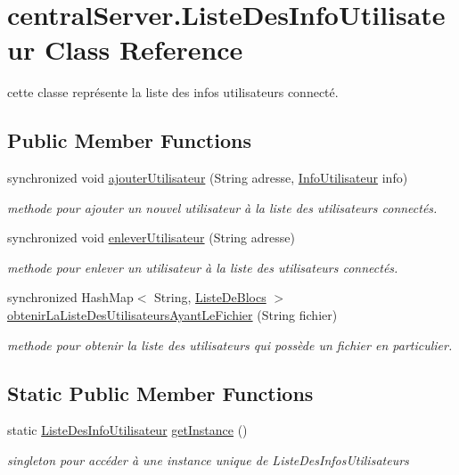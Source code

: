 \hypertarget{classcentralServer_1_1ListeDesInfoUtilisateur}{}\section{central\+Server.\+Liste\+Des\+Info\+Utilisateur Class Reference}
\label{classcentralServer_1_1ListeDesInfoUtilisateur}


cette classe représente la liste des infos utilisateurs connecté.  


\subsection*{Public Member Functions}
\begin{DoxyCompactItemize}
\item 
synchronized void \hyperlink{classcentralServer_1_1ListeDesInfoUtilisateur_a310ca7eb2f644fbd22809983e69b77fd}{ajouter\+Utilisateur} (String adresse, \hyperlink{classcommun_1_1InfoUtilisateur}{Info\+Utilisateur} info)
\begin{DoxyCompactList}\small\item\em methode pour ajouter un nouvel utilisateur à la liste des utilisateurs connectés. \end{DoxyCompactList}\item 
synchronized void \hyperlink{classcentralServer_1_1ListeDesInfoUtilisateur_a5d9e027bd438ac48b1dfda5e07d5f8fd}{enlever\+Utilisateur} (String adresse)
\begin{DoxyCompactList}\small\item\em methode pour enlever un utilisateur à la liste des utilisateurs connectés. \end{DoxyCompactList}\item 
synchronized Hash\+Map$<$ String, \hyperlink{classcommun_1_1ListeDeBlocs}{Liste\+De\+Blocs} $>$ \hyperlink{classcentralServer_1_1ListeDesInfoUtilisateur_a5949b79438d8cacb07e79dd9bc40876b}{obtenir\+La\+Liste\+Des\+Utilisateurs\+Ayant\+Le\+Fichier} (String fichier)
\begin{DoxyCompactList}\small\item\em methode pour obtenir la liste des utilisateurs qui possède un fichier en particulier. \end{DoxyCompactList}\end{DoxyCompactItemize}
\subsection*{Static Public Member Functions}
\begin{DoxyCompactItemize}
\item 
static \hyperlink{classcentralServer_1_1ListeDesInfoUtilisateur}{Liste\+Des\+Info\+Utilisateur} \hyperlink{classcentralServer_1_1ListeDesInfoUtilisateur_acf5b606e4e19bca4a22ca77a314e5bac}{get\+Instance} ()
\begin{DoxyCompactList}\small\item\em singleton pour accéder à une instance unique de Liste\+Des\+Infos\+Utilisateurs \end{DoxyCompactList}\end{DoxyCompactItemize}


